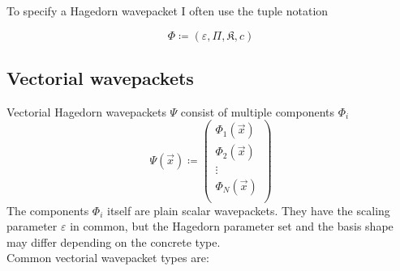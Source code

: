 \documentclass{article}
\begin{document}
To specify a Hagedorn wavepacket I often use the tuple notation

\[
  \Phi \coloneqq  \left(\varepsilon,\Pi,\mathfrak{K},c\right)
\]

\subsection{Vectorial wavepackets}
Vectorial Hagedorn wavepackets \(\Psi\) consist of multiple components \(\Phi_i\)
\[
  \Psi(\vec{x}) \coloneqq 
  \begin{pmatrix}
    \Phi_1(\vec{x}) \\
    \Phi_2(\vec{x}) \\
    \vdots \\
    \Phi_N(\vec{x}) \\
  \end{pmatrix}
\]
The components \(\Phi_i\) itself are plain scalar wavepackets.
They have the scaling parameter \(\varepsilon\) in common, but
the Hagedorn parameter set and the basis shape may differ depending on
the concrete type. \\
Common vectorial wavepacket types are:
\end{document}
